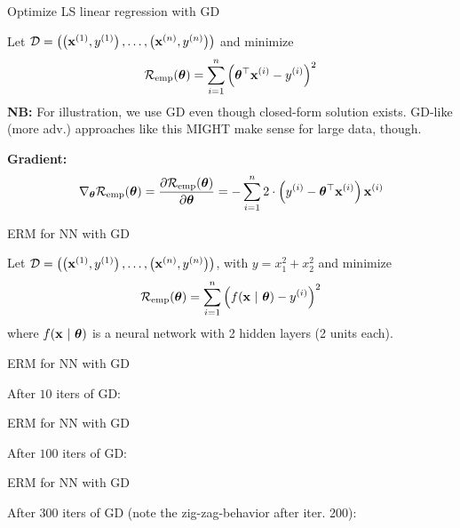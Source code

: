 \documentclass[11pt,compress,t,notes=noshow, xcolor=table]{beamer}
\begin{document}
\begin{framei}[fs=footnotesize]{Optimize LS linear regression with GD}
\item Let $\mathcal{D} = \left( \left(\mathbf{x}^{(1)}, y^{(1)}\right), \ldots, \left(\mathbf{x}^{(n)}, y^{(n)}\right)\right)$ and minimize 
$$\mathcal{R}_{\text{emp}}(\bm{\theta}) = \sum\limits_{i=1}^n \left(\bm{\theta}^\top \mathbf{x}^{(i)} - y^{(i)}\right)^2$$
\textbf{NB: } For illustration, we use GD even though closed-form solution exists. GD-like (more adv.) approaches like this MIGHT make sense for large data, though.
\item\textbf{Gradient: } $$\nabla_{\bm{\theta}}\mathcal{R}_{\text{emp}}(\bm{\theta}) =  \frac{\partial \mathcal{R}_{\text{emp}}(\bm{\theta})}{\partial
\bm{\theta}} = - \sum_{i=1}^n 2 \cdot \left(y^{(i)} - \bm{\theta}^{\top} \mathbf{x}^{(i)}\right) \mathbf{x}^{(i)}$$ 
\end{framei}

\begin{framei}{ERM for NN with GD}
\item Let $\mathcal{D} = \left( \left(\mathbf{x}^{(1)}, y^{(1)}\right), \ldots, \left(\mathbf{x}^{(n)}, y^{(n)}\right)\right)$, with $y = x_1^2 + x_2^2$ and minimize 
$$\mathcal{R}_{\text{emp}}(\bm{\theta}) = \sum\limits_{i=1}^n \left(f(\mathbf{x} ~|~ \bm{\theta}) - y^{(i)}\right)^2$$
where $f(\mathbf{x} ~|~ \bm{\theta})$ is a neural network with 2 hidden layers (2 units each). 
\vspace{-0.7cm}
\end{framei}

\begin{framei}{ERM for NN with GD}
\item[] After $10$ iters of GD:
{}
\end{framei}

\begin{framei}{ERM for NN with GD}
\item[] After $100$ iters of GD: 
{}
\end{framei}

\begin{framei}{ERM for NN with GD}
\item[] After $300$ iters of GD (note the zig-zag-behavior after iter. 200):
{}
\end{framei}
\end{document}
